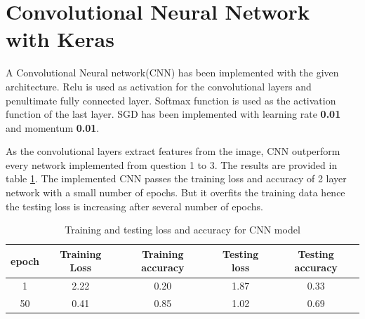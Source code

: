 \documentclass[a4paper, 12pt]{article}
\begin{document}
	\section{Convolutional Neural Network with Keras}
		A Convolutional Neural network(CNN) has been implemented with the given architecture. Relu is used as activation for the convolutional layers and penultimate fully connected layer. Softmax function is used as the activation function of the last layer. SGD has been implemented with learning rate \textbf{0.01} and momentum \textbf{ 0.01}. 
		\par 
		As the convolutional layers extract features from the image, CNN outperform every network implemented from question 1 to 3. The results are provided in table \ref{cnn_la}. The implemented CNN passes the training loss and accuracy of 2 layer network with a small number of epochs. But it overfits the training data hence the testing loss is increasing after several number of epochs.
		\begin{table}[h]
			\centering
			\begin{tabular}{|c|c|c|c|c|}
				\hline
				epoch & Training Loss & Training accuracy & Testing loss & Testing accuracy\\
				\hline
				1 & 2.22 & 0.20 & 1.87 & 0.33 \\
				50 & 0.41 & 0.85 & 1.02 & 0.69\\
				\hline
			\end{tabular}
			\caption{Training and testing loss and accuracy for CNN model}
			\label{cnn_la}
		\end{table}
\end{document}
